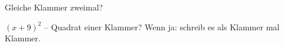 \setcounter{aufgabe}{12}

\begin{aufgabe}{Gleiche Klammer zweimal?}
\begin{teile}
\teil $(x + 9)^2$ – Quadrat einer Klammer? Wenn ja: schreib es als Klammer mal Klammer. \janein
\end{teile}
\end{aufgabe}

